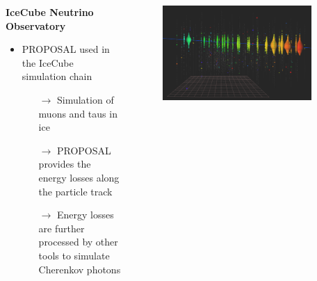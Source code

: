 \begin{frame}[c]
    \begin{columns}[onlytextwidth]
    \begin{column}{0.55\textwidth}
    \textbf{IceCube Neutrino Observatory}
        \begin{itemize}
            \item PROPOSAL used in the IceCube simulation chain
            \begin{itemize}
                \item[$\rightarrow$] Simulation of muons and taus in ice
                \item[$\rightarrow$] PROPOSAL provides the energy losses along the particle track
                \item[$\rightarrow$] Energy losses are further processed by other tools to simulate Cherenkov photons
            \end{itemize}
        \end{itemize}
    \end{column}
        \begin{column}{0.45\textwidth}
            \begin{figure}
                \centering
                \includegraphics[width=0.9\textwidth]{images/Track.png}
            \end{figure}
        \end{column}
    \end{columns}
\end{frame}


